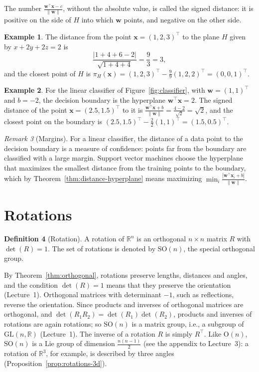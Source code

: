 \documentclass[11pt]{article}
\newcommand{\norm}[1]{\lVert #1 \rVert}
\theoremstyle{definition}
\newtheorem{definition}{Definition}[section]
\newtheorem{example}[definition]{Example}
\theoremstyle{plain}
\theoremstyle{remark}
\newtheorem{remark}[definition]{Remark}
\begin{document}
The number $\frac{\mathbf{w}^\top \mathbf{x} - c}{\norm{\mathbf{w}}}$, without the absolute value, is called the signed distance: it is positive on the side of $H$ into which $\mathbf{w}$ points, and negative on the other side.

\begin{example}
    The distance from the point $\mathbf{x} = (1, 2, 3)^\top$ to the plane $H$ given by $x + 2y + 2z = 2$ is
    \[\frac{|1 + 4 + 6 - 2|}{\sqrt{1 + 4 + 4}} = \frac{9}{3} = 3,\]
    and the closest point of $H$ is $\pi_H(\mathbf{x}) = (1, 2, 3)^\top - \frac{9}{9}(1, 2, 2)^\top = (0, 0, 1)^\top$.
\end{example}

\begin{example}\label{ex:classifier-distance}
    For the linear classifier of Figure~\ref{fig:classifier}, with $\mathbf{w} = (1, 1)^\top$ and $b = -2$, the decision boundary is the hyperplane $\mathbf{w}^\top \mathbf{x} = 2$. The signed distance of the point $\mathbf{x} = (2.5, 1.5)^\top$ to it is $\frac{\mathbf{w}^\top \mathbf{x} + b}{\norm{\mathbf{w}}} = \frac{4 - 2}{\sqrt{2}} = \sqrt{2}$, and the closest point on the boundary is $(2.5, 1.5)^\top - \frac{2}{2}(1, 1)^\top = (1.5, 0.5)^\top$.
\end{example}

\begin{remark}[Margins]
    For a linear classifier, the distance of a data point to the decision boundary is a measure of confidence: points far from the boundary are classified with a large margin. Support vector machines choose the hyperplane that maximizes the smallest distance from the training points to the boundary, which by Theorem~\ref{thm:distance-hyperplane} means maximizing $\min_i \frac{|\mathbf{w}^\top \mathbf{x}_i + b|}{\norm{\mathbf{w}}}$.
\end{remark}

\section{Rotations}\label{sec:rotations}

\begin{definition}[Rotation]
    A rotation of $\mathbb{R}^n$ is an orthogonal $n \times n$ matrix $R$ with $\det(R) = 1$. The set of rotations is denoted by $\mathrm{SO}(n)$, the special orthogonal group.
\end{definition}

By Theorem~\ref{thm:orthogonal}, rotations preserve lengths, distances and angles, and the condition $\det(R) = 1$ means that they preserve the orientation (Lecture~1). Orthogonal matrices with determinant $-1$, such as reflections, reverse the orientation. Since products and inverses of orthogonal matrices are orthogonal, and $\det(R_1 R_2) = \det(R_1)\det(R_2)$, products and inverses of rotations are again rotations; so $\mathrm{SO}(n)$ is a matrix group, i.e., a subgroup of $\mathrm{GL}(n, \mathbb{R})$ (Lecture~1). The inverse of a rotation $R$ is simply $R^\top$. Like $\mathrm{O}(n)$, $\mathrm{SO}(n)$ is a Lie group of dimension $\frac{n(n-1)}{2}$ (see the appendix to Lecture~3): a rotation of $\mathbb{R}^3$, for example, is described by three angles (Proposition~\ref{prop:rotations-3d}).
\end{document}
